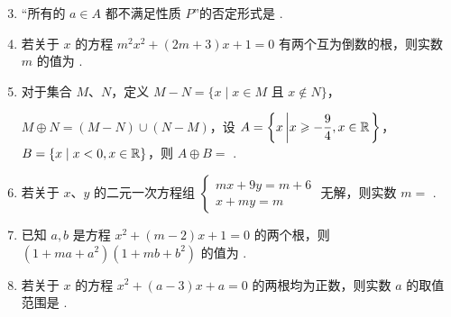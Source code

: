 \documentclass[a4paper,11pt]{article}
\begin{document}


\begin{enumerate}
\setcounter{enumi}{2}

\item “所有的 $a\in A$ 都不满足性质 $P$”的否定形式是 \blankline[4.4em].


\item 若关于 $x$ 的方程 $m^2x^2+(2m+3)x+1=0$ 有两个互为倒数的根，则实数 $m$ 的值为 \blankline[4.4em].


\item 对于集合 $M$、$N$，定义 $M-N=\{x\mid x\in M\text{ 且 }x\notin N\}$，

$M\oplus N=(M-N)\cup(N-M)$，设 $A=\left\{x\left|x\geqslant-\dfrac94,x\in\mathbb{R}\right.\right\}$，$B=\{x\mid x<0,x\in\mathbb{R}\}$，则 $A\oplus B=$ \blankline[4.4em].

\ifanswer
\solbegin
{}
\solend

\fi

\item 若关于 $x$、$y$ 的二元一次方程组 $\begin{cases}mx+9y=m+6\\ x+my=m\end{cases}$ 无解，则实数 $m=$ \blankline[4.4em].

\ifanswer
\solbegin
{}
\solend

\fi

\item 已知 $a,b$ 是方程 $x^2+(m-2)x+1=0$ 的两个根，则 $(1+ma+a^2)(1+mb+b^2)$ 的值为 \blankline[4.4em].


\item 若关于 $x$ 的方程 $x^2+(a-3)x+a=0$ 的两根均为正数，则实数 $a$ 的取值范围是 \blankline[4.4em].


\end{enumerate}
\end{document}
